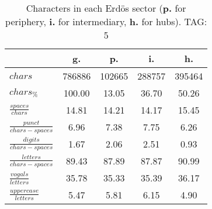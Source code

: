 \begin{table}[h!]
\begin{center}
\begin{tabular}{| l || c | c | c | c |}\hline
 & {\bf g.} & {\bf p.} & {\bf i.} & {\bf h.} \\\hline\hline
$chars$ & 786886  & 102665  & 288757  & 395464 \\
$chars_{\%}$ & 100.00  & 13.05  & 36.70  & 50.26 \\\hline
$\frac{spaces}{chars}$ & 14.81  & 14.21  & 14.17  & 15.45 \\
$\frac{punct}{chars-spaces}$ & 6.96  & 7.38  & 7.75  & 6.26 \\
$\frac{digits}{chars-spaces}$ & 1.67  & 2.06  & 2.51  & 0.93 \\\hline
$\frac{letters}{chars-spaces}$ & 89.43  & 87.89  & 87.87  & 90.99 \\
$\frac{vogals}{letters}$ & 35.78  & 35.33  & 35.39  & 36.17 \\
$\frac{uppercase}{letters}$ & 5.47  & 5.81  & 6.15  & 4.90 \\\hline
\end{tabular}
\caption{Characters in each Erd\"os sector ({{\bf p.}} for periphery, {{\bf i.}} for intermediary, 
    {{\bf h.}} for hubs). TAG: 5}
\end{center}
\end{table}